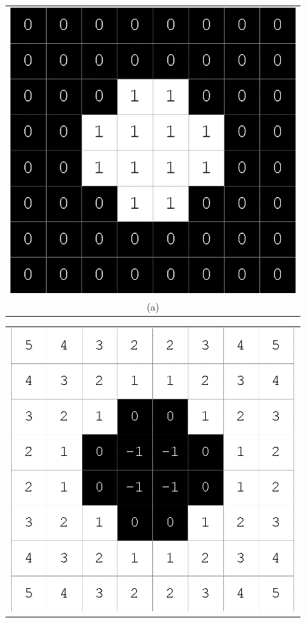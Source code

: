 \begin{figure}[h!]
\centering
\begin{minipage}{.45\textwidth}
\begin{tabular}{c}
\includegraphics[width=.9\textwidth]{levelset/orgNew} \\
(a)
\end{tabular}
\end{minipage}
\begin{minipage}{.45\textwidth}
\begin{tabular}{c}
\includegraphics[width=.9\textwidth]{levelset/manhattan} \\

\end{tabular}
\end{minipage}
\end{figure}
